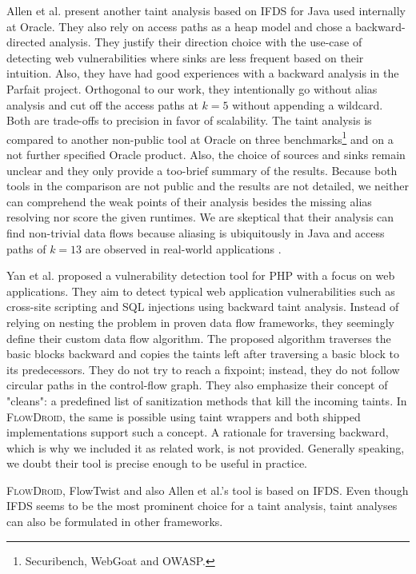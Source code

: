 \documentclass[../draft.tex]{subfiles}
\begin{document}
    Allen et al.\cite{Allen2021} present another taint analysis based on IFDS for Java used internally at Oracle.
    They also rely on access paths as a heap model and chose a backward-directed analysis.
    They justify their direction choice with the use-case of detecting web vulnerabilities where sinks are less frequent based on their intuition.
    Also, they have had good experiences with a backward analysis in the Parfait\cite{Winter2013} project.
    Orthogonal to our work, they intentionally go without alias analysis and cut off the access paths at $k=5$ without appending a wildcard.
    Both are trade-offs to precision in favor of scalability.
    The taint analysis is compared to another non-public tool at Oracle on three benchmarks\footnote{Securibench, WebGoat and OWASP.} and on a not further specified Oracle product.
    Also, the choice of sources and sinks remain unclear and they only provide a too-brief summary of the results.
    Because both tools in the comparison are not public and the results are not detailed, we neither can comprehend the weak points of their analysis besides the missing alias resolving nor score the given runtimes.
    We are skeptical that their analysis can find non-trivial data flows because aliasing is ubiquitously in Java and access paths of $k=13$ are observed in real-world applications \cite{Spaeth2019}.

    Yan et al.\cite{Yan2017} proposed a vulnerability detection tool for PHP with a focus on web applications.
    They aim to detect typical web application vulnerabilities such as cross-site scripting and SQL injections using backward taint analysis.
    Instead of relying on nesting the problem in proven data flow frameworks, they seemingly define their custom data flow algorithm.
    The proposed algorithm traverses the basic blocks backward and copies the taints left after traversing a basic block to its predecessors.
    They do not try to reach a fixpoint; instead, they do not follow circular paths in the control-flow graph.
    They also emphasize their concept of "cleans": a predefined list of sanitization methods that kill the incoming taints.
    In \textsc{FlowDroid}, the same is possible using taint wrappers and both shipped implementations support such a concept.
    A rationale for traversing backward, which is why we included it as related work, is not provided.
    Generally speaking, we doubt their tool is precise enough to be useful in practice.

    \textsc{FlowDroid}, FlowTwist and also Allen et al.'s tool is based on IFDS.
    Even though IFDS seems to be the most prominent choice for a taint analysis, taint analyses can also be formulated in other frameworks.
\end{document}
